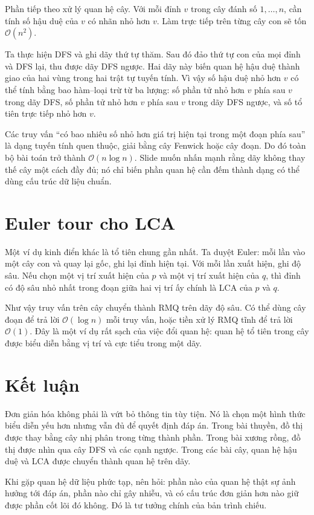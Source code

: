 \documentclass[11pt]{article}
\newcommand{\Oh}{\mathcal{O}}
\begin{document}
Phần tiếp theo xử lý quan hệ cây. Với mỗi đỉnh \(v\) trong cây đánh số
\(1,\ldots,n\), cần tính số hậu duệ của \(v\) có nhãn nhỏ hơn \(v\). Làm trực
tiếp trên từng cây con sẽ tốn \(\Oh(n^2)\).

Ta thực hiện DFS và ghi dãy thứ tự thăm. Sau đó đảo thứ tự con của mọi đỉnh và
DFS lại, thu được dãy DFS ngược. Hai dãy này biến quan hệ hậu duệ thành giao
của hai vùng trong hai trật tự tuyến tính. Vì vậy số hậu duệ nhỏ hơn \(v\) có
thể tính bằng bao hàm--loại trừ từ ba lượng: số phần tử nhỏ hơn \(v\) phía sau
\(v\) trong dãy DFS, số phần tử nhỏ hơn \(v\) phía sau \(v\) trong dãy DFS
ngược, và số tổ tiên trực tiếp nhỏ hơn \(v\).

Các truy vấn ``có bao nhiêu số nhỏ hơn giá trị hiện tại trong một đoạn phía
sau'' là dạng tuyến tính quen thuộc, giải bằng cây Fenwick hoặc cây đoạn. Do
đó toàn bộ bài toán trở thành \(\Oh(n\log n)\). Slide muốn nhấn mạnh rằng
dãy không thay thế cây một cách đầy đủ; nó chỉ biến phần quan hệ cần đếm thành
dạng có thể dùng cấu trúc dữ liệu chuẩn.

\section{Euler tour cho LCA}

Một ví dụ kinh điển khác là tổ tiên chung gần nhất. Ta duyệt Euler: mỗi lần
vào một cây con và quay lại gốc, ghi lại đỉnh hiện tại. Với mỗi lần xuất hiện,
ghi độ sâu. Nếu chọn một vị trí xuất hiện của \(p\) và một vị trí xuất hiện
của \(q\), thì đỉnh có độ sâu nhỏ nhất trong đoạn giữa hai vị trí ấy chính là
LCA của \(p\) và \(q\).

Như vậy truy vấn trên cây chuyển thành RMQ trên dãy độ sâu. Có thể dùng cây
đoạn để trả lời \(\Oh(\log n)\) mỗi truy vấn, hoặc tiền xử lý RMQ tĩnh để trả
lời \(\Oh(1)\). Đây là một ví dụ rất sạch của việc đổi quan hệ: quan hệ tổ
tiên trong cây được biểu diễn bằng vị trí và cực tiểu trong một dãy.

\section{Kết luận}

Đơn giản hóa không phải là vứt bỏ thông tin tùy tiện. Nó là chọn một hình thức
biểu diễn yếu hơn nhưng vẫn đủ để quyết định đáp án. Trong bài thuyền, đồ thị
được thay bằng cây nhị phân trong từng thành phần. Trong bài xương rồng, đồ
thị được nhìn qua cây DFS và các cạnh ngược. Trong các bài cây, quan hệ hậu
duệ và LCA được chuyển thành quan hệ trên dãy.

Khi gặp quan hệ dữ liệu phức tạp, nên hỏi: phần nào của quan hệ thật sự ảnh
hưởng tới đáp án, phần nào chỉ gây nhiễu, và có cấu trúc đơn giản hơn nào giữ
được phần cốt lõi đó không. Đó là tư tưởng chính của bản trình chiếu.
\end{document}
